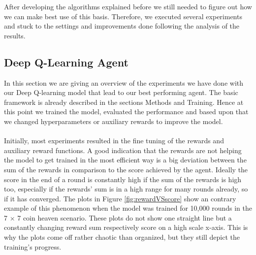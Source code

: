 
After developing the algorithms explained before we still needed to figure out how we can make best use of this basis. Therefore, we executed several experiments and stuck to the settings and improvements done following the analysis of the results.

\subsection{Deep Q-Learning Agent} \label{sec:deepqexperiments}

In this section we are giving an overview of the experiments we have done with our Deep Q-learning model that lead to our best performing agent. The basic framework is already described in the sections Methods and Training. Hence at this point we trained the model, evaluated the performance and based upon that we changed hyperparameters or auxiliary rewards to improve the model.\\ \\
Initially, most experiments resulted in the fine tuning of the rewards and auxiliary reward functions. A good indication that the rewards are not helping the model to get trained in the most efficient way is a big deviation between the sum of the rewards in comparison to the score achieved by the agent. Ideally the score in the end of a round is constantly high if the sum of the rewards is high too, especially if the rewards' sum is in a high range for many rounds already, so if it has converged. The plots in Figure \ref{fig:rewardVSscore} show an contrary example of this phenomenon when the model was trained for 10,000 rounds in the 7 $\times$ 7 coin heaven scenario. These plots do not show one straight line but a constantly changing reward sum respectively score on a high scale x-axis. This is why the plots come off rather chaotic than organized, but they still depict the training's progress. 
